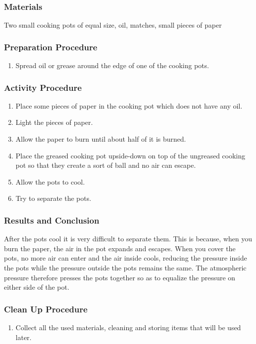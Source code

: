 \subsubsection*{Materials}
Two small cooking pots of equal size, oil, matches, small pieces of paper

\subsubsection*{Preparation Procedure}
\begin{enumerate}
\item{Spread oil or grease around the edge of one of the cooking pots.} 
\end{enumerate}

\subsubsection*{Activity Procedure}
\begin{enumerate}
\item{Place some pieces of paper in the cooking pot which does not have any oil.} 
\item{Light the pieces of paper.} 
\item{Allow the paper to burn until about half of it is burned.} 
\item{Place the greased cooking pot upside-down on top of the ungreased cooking pot so that they create a sort of ball and no air can escape.} 
\item{Allow the pots to cool.} 
\item{Try to separate the pots.} 
\end{enumerate}

\subsubsection*{Results and Conclusion}
After the pots cool it is very difficult to separate them. This is because, when you burn the paper, the air in the pot expands and escapes. When you cover the pots, no more air can enter and the air inside cools, reducing the pressure inside the pots while the pressure outside the pots remains the same. The atmospheric pressure therefore presses the pots together so as to equalize the pressure on either side of the pot. 

\subsubsection*{Clean Up Procedure}
\begin{enumerate}
\item{Collect all the used materials, cleaning and storing items that will be used later.} 
\end{enumerate}

